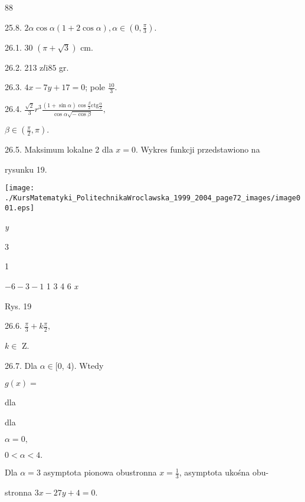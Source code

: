 \documentclass[a4paper,12pt]{article}
\begin{document}
88

25.8. $2\alpha\cos\alpha(1+2\cos\alpha), \alpha\in (0,\displaystyle \frac{\pi}{3}).$

26.1. 30 $(\pi+\sqrt{3})$ cm.

26.2. 213 $\mathrm{z}l\mathrm{i}85$ gr.

26.3. $4x-7y+17=0$; pole $\displaystyle \frac{10}{3}.$

26.4. $\displaystyle \frac{\sqrt{2}}{3}r^{3}\frac{(1+\sin\alpha)\cos\frac{\beta}{2}\mathrm{c}\mathrm{t}\mathrm{g}\frac{\alpha}{2}}{\cos\alpha\sqrt{-\cos\beta}},$

$\beta\in (\displaystyle \frac{\pi}{2},\pi).$

26.5. Maksimum lokalne 2 dla $x=0$. Wykres funkcji przedstawiono na

rysunku 19.
\begin{center}
\texttt{[image: ./KursMatematyki\_PolitechnikaWroclawska\_1999\_2004\_page72\_images/image001.eps]}
\end{center}
{\it y}

3

1

$-6  -3  -1$  1 3 4  6 {\it x}

Rys. 19

26.6. $\displaystyle \frac{\pi}{3}+k\frac{\pi}{2},$

$ k\in$ Z.

26.7. Dla $\alpha\in[0$, 4). Wtedy

$g(x)=$

dla

dla

$\alpha=0,$

$0<\alpha<4.$

Dla $\alpha=3$ asymptota pionowa obustronna $x= \displaystyle \frac{1}{3}$, asymptota ukośna obu-

stronna $3x-27y+4=0.$
\end{document}
